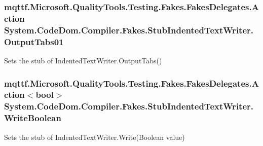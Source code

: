 \hypertarget{class_system_1_1_code_dom_1_1_compiler_1_1_fakes_1_1_stub_indented_text_writer_a39c8ada00f2535438cf97199a4592028}{
\subsubsection[{Output\-Tabs01}]{\setlength{\rightskip}{0pt plus 5cm}mqttf.\-Microsoft.\-Quality\-Tools.\-Testing.\-Fakes.\-Fakes\-Delegates.\-Action System.\-Code\-Dom.\-Compiler.\-Fakes.\-Stub\-Indented\-Text\-Writer.\-Output\-Tabs01}}\label{class_system_1_1_code_dom_1_1_compiler_1_1_fakes_1_1_stub_indented_text_writer_a39c8ada00f2535438cf97199a4592028}


Sets the stub of Indented\-Text\-Writer.\-Output\-Tabs()

\hypertarget{class_system_1_1_code_dom_1_1_compiler_1_1_fakes_1_1_stub_indented_text_writer_a5aab0f0b685e07723ec37221921fda6f}{
\subsubsection[{Write\-Boolean}]{\setlength{\rightskip}{0pt plus 5cm}mqttf.\-Microsoft.\-Quality\-Tools.\-Testing.\-Fakes.\-Fakes\-Delegates.\-Action$<$bool$>$ System.\-Code\-Dom.\-Compiler.\-Fakes.\-Stub\-Indented\-Text\-Writer.\-Write\-Boolean}}\label{class_system_1_1_code_dom_1_1_compiler_1_1_fakes_1_1_stub_indented_text_writer_a5aab0f0b685e07723ec37221921fda6f}


Sets the stub of Indented\-Text\-Writer.\-Write(\-Boolean value)

